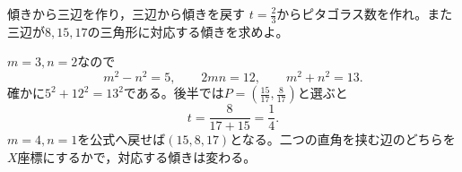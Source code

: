 \begin{example}{傾きから三辺を作り，三辺から傾きを戻す}
$t=\frac23$からピタゴラス数を作れ。また三辺が$8,15,17$の三角形に対応する傾きを求めよ。
\end{example}

$m=3,n=2$なので
\[
m^2-n^2=5,\qquad2mn=12,\qquad m^2+n^2=13.
\]
確かに$5^2+12^2=13^2$である。後半では$P=\left(\frac{15}{17},\frac8{17}\right)$と選ぶと
\[
t=\frac8{17+15}=\frac14.
\]
$m=4,n=1$を公式へ戻せば$(15,8,17)$となる。二つの直角を挟む辺のどちらを$X$座標にするかで，対応する傾きは変わる。

